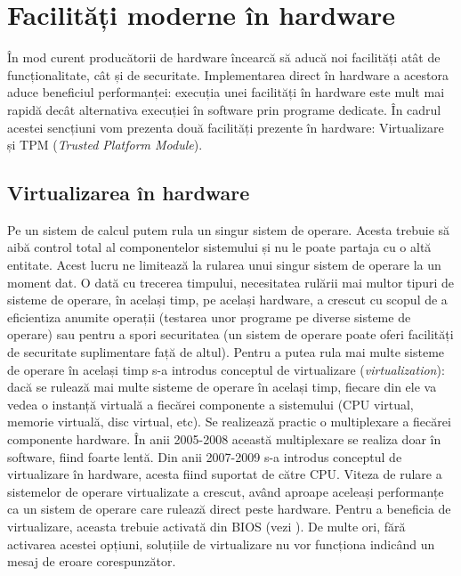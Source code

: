 
\section{Facilități moderne în hardware}
\label{sec:hardware-functionalitati}

În mod curent producătorii de hardware încearcă să aducă noi facilități atât de
funcționalitate, cât și de securitate. Implementarea direct în hardware a
acestora aduce beneficiul performanței: execuția unei facilități în hardware
este mult mai rapidă decât alternativa execuției în software prin programe
dedicate. În cadrul acestei sencțiuni vom prezenta două facilități prezente în
hardware: Virtualizare și TPM 
(\textit{Trusted Platform Module}).

\subsection{Virtualizarea în hardware}
\label{sec:hardware-functionalitati-virt}

Pe un sistem de calcul putem rula un singur sistem de operare. Acesta trebuie să
aibă control total al componentelor sistemului și nu le poate partaja cu o altă
entitate. Acest lucru ne limitează la rularea unui singur sistem de operare la
un moment dat. O dată cu trecerea timpului, necesitatea rulării mai multor
tipuri de sisteme de operare, în același timp, pe același hardware, a crescut cu
scopul de a eficientiza anumite operații (testarea unor programe pe diverse
sisteme de operare) sau pentru a spori securitatea (un sistem de operare poate
oferi facilități de securitate suplimentare față de altul). Pentru a putea rula
mai multe sisteme de operare în același timp s-a introdus conceptul de
virtualizare (\textit{virtualization}): dacă se rulează mai multe sisteme de
operare în același timp, fiecare din ele va vedea o instanță virtuală a fiecărei
componente a sistemului (CPU virtual, memorie virtuală, disc virtual, etc). Se
realizează practic o multiplexare a fiecărei componente hardware. În anii
2005-2008 această multiplexare se realiza doar în software, fiind foarte lentă.
Din anii 2007-2009 s-a introdus conceptul de virtualizare în hardware, acesta
fiind suportat de către CPU. Viteza de rulare a sistemelor de operare
virtualizate a crescut, având aproape aceleași performanțe ca un sistem de
operare care rulează direct peste hardware. Pentru a beneficia de virtualizare,
aceasta trebuie activată din BIOS (vezi ).
De multe ori, fără activarea acestei opțiuni, soluțiile de virtualizare nu vor
funcționa indicând un mesaj de eroare corespunzător.

